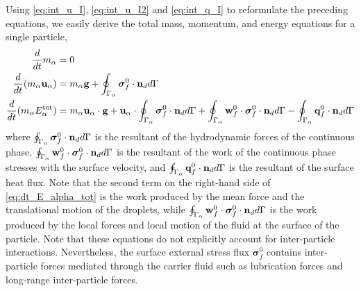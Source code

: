 Using \ref{eq:int_u_I}, \ref{eq:int_u_I2} and \ref{eq:int_q_I} to reformulate the preceding equations, we easily derive the total mass, momentum, and energy equations for a single particle, 
\begin{align}
    \label{eq:dt_m_alpha}
    \ddt m_\alpha
    &= 
    0\\
    \label{eq:dt_p_alpha}
    \ddt (m_\alpha \textbf{u}_\alpha)
    &= 
    m_\alpha\textbf{g}
    +  \intS{\bm{\sigma}_f^0 \cdot \textbf{n}_d}\\
    \label{eq:dt_E_alpha_tot}
    \ddt (m_\alpha E_\alpha^\text{tot})
    &= 
    m_\alpha \textbf{u}_\alpha \cdot \textbf{g}
    +\textbf{u}_\alpha \cdot \intS{\bm{\sigma}_f^0 \cdot \textbf{n}_d}
    +\intS{\textbf{w}_f^0 \cdot \bm{\sigma}_f^0 \cdot  \textbf{n}_d} 
    - \intS{\textbf{q}_f^0 \cdot \textbf{n}_d}
\end{align}
where  $\oint_{\Gamma_{\alpha}}   \bm{\sigma}_f^0 \cdot \textbf{n}_d  d\Gamma$ is the resultant of the hydrodynamic forces of the continuous phase, $\oint_{\Gamma_{\alpha}} \textbf{w}_f^0 \cdot \bm{\sigma}_f^0 \cdot  \textbf{n}_d d\Gamma $ is the resultant of the work of the continuous phase stresses with the surface velocity, and $\oint_{\Gamma_{\alpha}}  \textbf{q}_f^0 \cdot \textbf{n}_d  d\Gamma$ is the resultant of the surface heat flux. 
Note that the second term on the right-hand side of \ref{eq:dt_E_alpha_tot} is the work produced by the mean force and the translational motion of the droplets, while $\oint_{\Gamma_{\alpha}} \textbf{w}_f^0 \cdot \bm{\sigma}_f^0 \cdot  \textbf{n}_d d\Gamma$ is the work produced by the local forces and local motion of the fluid at the surface of the particle.
Note that these equations do not explicitly account for inter-particle interactions. 
Nevertheless, the surface external stress flux $\bm{\sigma}_f^0$ contains inter-particle forces mediated through the carrier fluid such as lubrication forces and long-range inter-particle forces.

